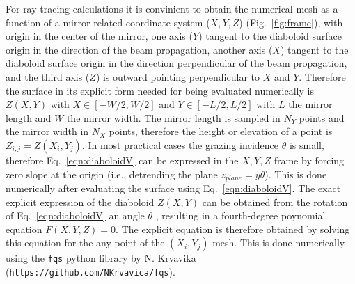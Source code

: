 \documentclass{iucr}              %
\newcommand{\inred}[1]{{\color{red}#1}}
\begin{document}
For ray tracing calculations it is convinient to obtain the numerical mesh as a function of a mirror-related coordinate system ($X,Y,Z$) (Fig.~\ref{fig:frame}), with origin in the center of the mirror, one axis ($Y$) tangent to the diaboloid surface origin in the direction of the beam propagation, another axis ($X$) tangent to the diaboloid surface origin in the direction perpendicular of the beam propagation, and the third axis ($Z$) is outward pointing perpendicular to $X$ and $Y$. Therefore the surface in its explicit form needed for being evaluated numerically is $Z(X,Y)$ with $X \in [-W/2, W/2]$ and $Y \in [-L/2, L/2]$ with $L$ the mirror length and $W$ the mirror width. The mirror length is sampled in $N_Y$ points and the mirror width in $N_X$ points, therefore the height or elevation of a point is $Z_{i,j}=Z(X_i,Y_j)$.
In most practical cases the grazing incidence $\theta$ is small, therefore Eq.~\ref{eqn:diaboloidV} can be expressed in the $X,Y,Z$ frame by forcing zero slope at the origin (i.e., detrending the plane $z_{plane}=y \theta$). This is done numerically after evaluating the surface using Eq.~\ref{eqn:diaboloidV}. 
The exact explicit expression of the diaboloid $Z(X,Y)$ can be obtained from the rotation of Eq.~\ref{eqn:diaboloidV} an angle $\theta$ \cite{part2}, resulting in a fourth-degree poynomial equation $F(X,Y,Z)=0$. The explicit equation is therefore obtained by solving this equation for the any point of the $(X_i,Y_j)$ mesh. This is done numerically using the {\tt fqs} python library by N. Krvavika ({\tt https://github.com/NKrvavica/fqs}). 





\end{document}
